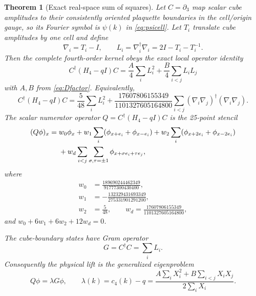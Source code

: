 \documentclass[11pt]{article}
\newtheorem{theorem}{Theorem}[section]
\begin{document}
\begin{theorem}[Exact real-space sum of squares]\label{thm:y4sos}
Let $C=\partial_3$ map scalar cube amplitudes to their consistently oriented
plaquette boundaries in the cell/origin gauge, so its Fourier symbol is
$\psi(k)$ in \eqref{eq:psicell}. Let $T_i$ translate cube amplitudes by one
cell and define
\[
\nabla_i=T_i-I,
\qquad
L_i=\nabla_i^\dagger\nabla_i=2I-T_i-T_i^{-1}.
\]
Then the complete fourth-order kernel obeys the exact local operator identity
\begin{equation}
\boxed{
C^\dagger(H_4-qI)C
=\frac{A}{4}\sum_iL_i^2
+\frac{B}{4}\sum_{i<j}L_iL_j
}
\label{eq:sosoperator}
\end{equation}
with $A,B$ from \eqref{eq:Dfactor}. Equivalently,
\begin{equation}
C^\dagger(H_4-qI)C
=\frac5{48}\sum_iL_i^2
+\frac{17607806155349}{1101327605164800}
\sum_{i<j}(\nabla_i\nabla_j)^\dagger
               (\nabla_i\nabla_j).
\label{eq:sosexplicit}
\end{equation}
The scalar numerator operator $Q=C^\dagger(H_4-qI)C$ is the 25-point stencil
\begin{align}
(Q\phi)_x={}&w_0\phi_x
+w_1\sum_i(\phi_{x+e_i}+\phi_{x-e_i})
+w_2\sum_i(\phi_{x+2e_i}+\phi_{x-2e_i})\notag\\
&+w_d\sum_{i<j}\sum_{\sigma,\tau=\pm1}
\phi_{x+\sigma e_i+\tau e_j},
\label{eq:sosstencil}
\end{align}
where
\begin{equation}
\begin{split}
w_0&=\frac{189690244462349}{91777300430400},\\
w_1&=-\frac{132329431693349}{275331901291200},\\
w_2&=\frac5{48},\qquad
w_d=\frac{17607806155349}{1101327605164800},
\end{split}
\label{eq:sosweights}
\end{equation}
and $w_0+6w_1+6w_2+12w_d=0$.

The cube-boundary states have Gram operator
\begin{equation}
G=C^\dagger C=\sum_iL_i.
\label{eq:cubegram}
\end{equation}
Consequently the physical lift is the generalized eigenproblem
\begin{equation}
Q\phi=\lambda G\phi,
\qquad
\lambda(k)=c_4(k)-q
=\frac{A\sum_iX_i^2+B\sum_{i<j}X_iX_j}
       {2\sum_iX_i}.
\label{eq:sosgeneralized}
\end{equation}
\end{theorem}
\end{document}
